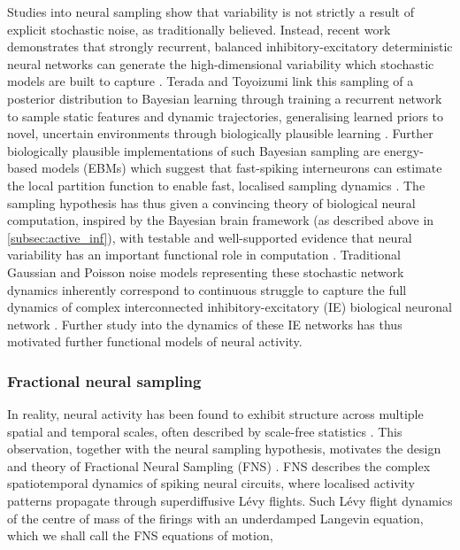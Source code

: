 Studies into neural sampling show that variability is not strictly a result of explicit stochastic noise, as traditionally believed. Instead, recent work demonstrates that strongly recurrent, balanced inhibitory-excitatory deterministic neural networks can generate the high-dimensional variability which stochastic models are built to capture \cite{terada_chaotic_2024, NIPS2002_a486cd07}. Terada and Toyoizumi link this sampling of a posterior distribution to Bayesian learning through training a recurrent network to sample static features and dynamic trajectories, generalising learned priors to novel, uncertain environments through biologically plausible learning \cite{terada_chaotic_2024}. Further biologically plausible implementations of such Bayesian sampling are energy-based models (EBMs) which suggest that fast-spiking interneurons can estimate the local partition function to enable fast, localised sampling dynamics \cite{dong_neural_nodate}. The sampling hypothesis has thus given a convincing theory of biological neural computation, inspired by the Bayesian brain framework (as described above in \ref{subsec:active_inf}), with testable and well-supported evidence that neural variability has an important functional role in computation \cite{orban_neural_2016, ujfalussy_sampling_2022}. Traditional Gaussian and Poisson noise models representing these stochastic network dynamics inherently correspond to continuous struggle to capture the full dynamics of complex interconnected inhibitory-excitatory (IE) biological neuronal network \cite{koren_efficient_2025, kilgore_biologically-informed_2025, song_training_2016}. Further study into the dynamics of these IE networks has thus motivated further functional models of neural activity.

\subsubsection*{Fractional neural sampling}

In reality, neural activity has been found to exhibit structure across multiple spatial and temporal scales, often described by scale-free statistics \cite{boonstra_scale-free_2013, he_scale-free_2014, he_temporal_2010, jiao_biologically_2026, jones_scale-free_2023, lin_scale-free_2016, mashour_conscious_2020, roberts_heavy_2015, zhang_heavy-tailed_2025}. This observation, together with the neural sampling hypothesis, motivates the design and theory of Fractional Neural Sampling (FNS) \cite{qi_fractional_2022}. FNS describes the complex spatiotemporal dynamics of spiking neural circuits, where localised activity patterns propagate through superdiffusive Lévy flights. Such Lévy flight dynamics of the centre of mass of the firings with an underdamped Langevin equation, which we shall call the FNS equations of motion,

